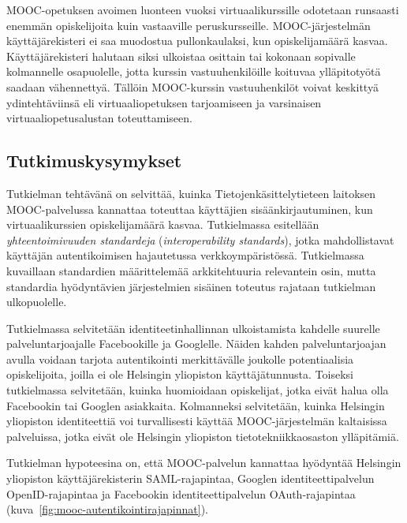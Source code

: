 \documentclass[finnish,gradu]{tktltiki}
\begin{document}
  MOOC-opetuksen avoimen luonteen vuoksi virtuaalikurssille odotetaan runsaasti enemmän opiskelijoita kuin vastaaville peruskursseille. MOOC-järjestelmän käyttäjärekisteri ei saa muodostua pullonkaulaksi, kun opiskelijamäärä kasvaa. Käyttäjärekisteri halutaan siksi ulkoistaa osittain tai kokonaan sopivalle kolmannelle osapuolelle, jotta kurssin vastuuhenkilöille koituvaa ylläpitotyötä saadaan vähennettyä. Tällöin MOOC-kurssin vastuuhenkilöt voivat keskittyä ydintehtäviinsä eli virtuaaliopetuksen tarjoamiseen ja varsinaisen virtuaaliopetusalustan toteuttamiseen.





\subsection{Tutkimuskysymykset} %
\label{sub:tutkimuskysymys}

Tutkielman tehtävänä on selvittää, kuinka Tietojenkäsittelytieteen laitoksen MOOC-palvelussa kannattaa toteuttaa käyttäjien sisäänkirjautuminen, kun virtuaalikurssien opiskelijamäärä kasvaa. Tutkielmassa esitellään \emph{yhteentoimivuuden standardeja} (\emph{interoperability standards}), jotka mahdollistavat käyttäjän autentikoimisen hajautetussa verkkoympäristössä. Tutkielmassa kuvaillaan standardien määrittelemää arkkitehtuuria relevantein osin, mutta standardia hyödyntävien järjestelmien sisäinen toteutus rajataan tutkielman ulkopuolelle.

Tutkielmassa selvitetään identiteetinhallinnan ulkoistamista kahdelle suurelle palveluntarjoajalle Facebookille ja Googlelle. Näiden kahden palveluntarjoajan avulla voidaan tarjota autentikointi merkittävälle joukolle potentiaalisia opiskelijoita, joilla ei ole Helsingin yliopiston käyttäjätunnusta. Toiseksi tutkielmassa selvitetään, kuinka huomioidaan opiskelijat, jotka eivät halua olla Facebookin tai Googlen asiakkaita. Kolmanneksi selvitetään, kuinka Helsingin yliopiston identiteettiä voi turvallisesti käyttää MOOC-järjestelmän kaltaisissa palveluissa, jotka eivät ole Helsingin yliopiston tietotekniikkaosaston ylläpitämiä.

Tutkielman hypoteesina on, että MOOC-palvelun kannattaa hyödyntää Helsingin yliopiston käyttäjärekisterin SAML-rajapintaa, Googlen identiteettipalvelun OpenID-rajapintaa ja Facebookin identiteettipalvelun OAuth-rajapintaa (kuva~\ref{fig:mooc-autentikointirajapinnat}).
\end{document}
